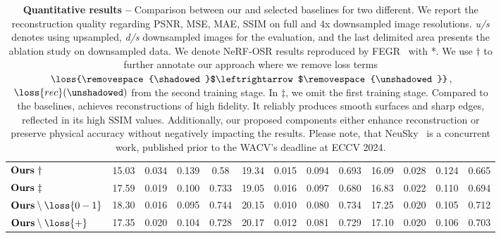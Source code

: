 \begin{table}[t]
{\begin{tabular}{lcccccccccccc}
      \midrule
      $\text{\textbf{Ours}}~\dagger$                & 15.03                             & 0.034                             & 0.139                             & 0.58            & 19.34           & 0.015            & 0.094            & 0.693           & 16.09           & 0.028            & 0.124            & 0.665           \\
      $\text{\textbf{Ours}}~\ddagger$               & 17.59                             & 0.019                             & 0.100                             & 0.733           & 19.05           & 0.016            & 0.097            & 0.680           & 16.83           & 0.022            & 0.110            & 0.694           \\
      $\text{\textbf{Ours}}\setminus\loss{0-1}$     & 18.30                             & 0.016                             & 0.095                             & 0.744           & 20.15           & 0.010            & 0.080            & 0.734           & 17.25           & 0.020            & 0.105            & 0.712           \\
      $\text{\textbf{Ours}}\setminus\loss{+}$       & 17.35                             & 0.020                             & 0.104                             & 0.728           & 20.17           & 0.012            & 0.081            & 0.729           & 17.10           & 0.020            & 0.106            & 0.703           \\

      \bottomrule
    \end{tabular}
  }
  \caption{\textbf{Quantitative results --}
    Comparison between our \lumigauss and selected baselines for two
    different.
    We report the reconstruction quality regarding PSNR, MSE, MAE, SSIM on
    full and 4x downsampled image resolutions.
    \textit{u/s} denotes using upsampled, \textit{d/s} downsampled images for the evaluation, and the last delimited area presents the ablation study on downsampled data.
    We denote NeRF-OSR \cite{rudnev2022nerfosr} results reproduced by
    FEGR~\cite{wang2023fegr} with *.
    We use $\dagger$ to further annotate our approach where we remove loss
    terms
    $\loss{\removespace{\shadowed}$\leftrightarrow$\removespace{\unshadowed}}$,
    $\loss{rec}(\unshadowed)$ from the second training stage.
    In $\ddagger$, we omit the first training stage.
    Compared to the baselines, \lumigauss achieves reconstructions of high
    fidelity.
    It reliably produces smooth surfaces and sharp edges, reflected in its
    high SSIM values.
    Additionally, our proposed components either enhance reconstruction or
    preserve physical accuracy without negatively impacting the results.
    Please note, that NeuSky~\cite{gardner2023neusky} is a concurrent work,
    published prior to the WACV's deadline at ECCV 2024.
  }

  \label{tab:lumigauss-results_osr_eval}
\end{table}
